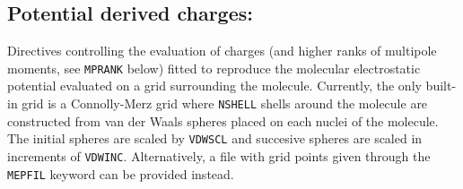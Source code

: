 \subsection{Potential derived charges: }
\label{subsec:qfit}

Directives controlling the evaluation of charges (and higher ranks of multipole moments, see \verb|MPRANK| below) fitted to reproduce the molecular electrostatic potential evaluated on a grid surrounding the molecule. Currently, the only built-in grid is a Connolly-Merz grid where \verb|NSHELL| shells around the molecule are constructed from van der Waals spheres placed on each nuclei of the molecule. The initial spheres are scaled by \verb|VDWSCL| and succesive spheres are scaled in increments of \verb|VDWINC|. Alternatively, a file with grid points given through the \verb|MEPFIL| keyword can be provided instead.

